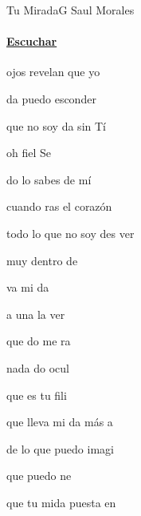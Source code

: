 \documentclass[12pt, spanish]{book}
\begin{document}
    \begin{song}{Tu Mirada}{G}
    {} %
    {Saul Morales}
    {} %
    {}
        \ifChordBk
            \paragraph{\mbox{}\hfill\protect\href{https://open.spotify.com/intl-es/track/5J0uf12z6hlORXOcuEGy8f}{Escuchar}\mbox{}\hfill}
        \fi


        \begin{SBOpGroup}
             ojos revelan que yo

            da puedo esconder

            que no soy da sin Tí

            oh fiel Se~
        \end{SBOpGroup}

        \begin{SBOpGroup}
            do lo sabes de mí

            cuando ras el corazón

            todo lo que no soy des ver

            muy dentro de ~
        \end{SBOpGroup}

        \begin{SBOpGroup}
            va mi da

            a una la ver

            que do me ra

            nada do ocul
        \end{SBOpGroup}

        \begin{SBChorus}
             que es tu fili

            que lleva mi da más a

            de lo que puedo imagi~

             que  puedo ne

            que tu mida puesta en 


\end{SBChorus}
\end{song}
\end{document}

